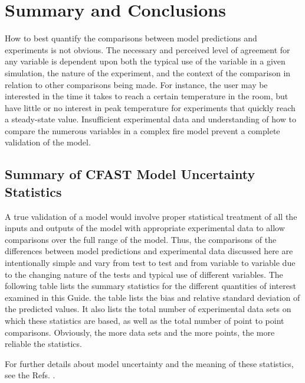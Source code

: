 \chapter{Summary and Conclusions}

How to best quantify the comparisons between model predictions and experiments is not obvious. The necessary and perceived level of agreement for any variable is dependent upon both the typical use of the variable in a given simulation, the nature of the experiment, and the context of the comparison in relation to other comparisons being made. For instance, the user may be interested in the time it takes to reach a certain temperature in the room, but have little or no interest in peak temperature for experiments that quickly reach a steady-state value. Insufficient experimental data and understanding of how to compare the numerous variables in a complex fire model prevent a complete validation of the model.

\section{Summary of CFAST Model Uncertainty Statistics}

A true validation of a model would involve proper statistical treatment of all the inputs and outputs of the model with appropriate experimental data to allow comparisons over the full range of the model. Thus, the comparisons of the differences between model predictions and experimental data discussed here are intentionally simple and vary from test to test and from variable to variable due to the changing nature of the tests and typical use of different variables. The following table lists the summary statistics for the different quantities of interest examined in this Guide. the table lists the bias and relative standard deviation of the predicted values. It also lists the total number of experimental data sets on which these statistics are based, as well as the total number of point to point comparisons. Obviously, the more data sets and the more points, the more reliable the statistics.

For further details about model uncertainty and the meaning of these statistics, see the Refs. \cite{FDS_Validation_Guide_6, NRCNUREG1824}.

\begin{table}

\vspace{0.1in}

\end{table}

